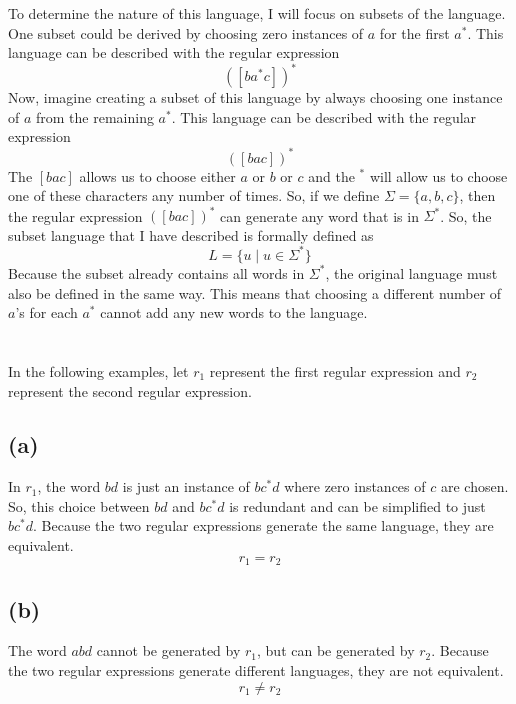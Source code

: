 \documentclass[12pt]{article}
\begin{document}
To determine the nature of this language, I will focus on subsets of the language. One subset could be derived by choosing zero instances of $a$ for the first $a^*$. This language can be described with the regular expression $$ ([ba^*c])^* $$ Now, imagine creating a subset of this language by always choosing one instance of $a$ from the remaining $a^*$. This language can be described with the regular expression $$ ([bac])^* $$ The $[bac]$ allows us to choose either $a$ or $b$ or $c$ and the $^*$ will allow us to choose one of these characters any number of times. So, if we define $ \Sigma = \{a, b, c\} $, then the regular expression $ ([bac])^* $ can generate any word that is in $\Sigma^*$. So, the subset language that I have described is formally defined as $$ \boxed{L = \{ u \mid u \in \Sigma^* \}} $$ Because the subset already contains all words in $\Sigma^*$, the original language must also be defined in the same way. This means that choosing a different number of $a$'s for each $a^*$ cannot add any new words to the language. 

\section{}

In the following examples, let $r_1$ represent the first regular expression and $r_2$ represent the second regular expression. 

\subsection*{(a)}

In $r_1$, the word $bd$ is just an instance of $bc^*d$ where zero instances of $c$ are chosen. So, this choice between $bd$ and $bc^*d$ is redundant and can be simplified to just $bc^*d$. Because the two regular expressions generate the same language, they are equivalent. $$\boxed{r_1 = r_2}$$

\subsection*{(b)}

The word $abd$ cannot be generated by $r_1$, but can be generated by $r_2$. Because the two regular expressions generate different languages, they are not equivalent. $$\boxed{r_1 \neq r_2}$$
\end{document}

